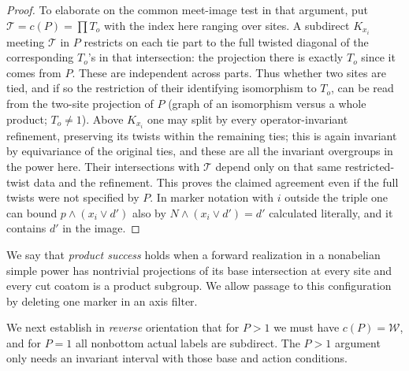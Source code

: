 \begin{proof}
To elaborate on the common meet-image test in that argument, put \(\mathcal T=c(P)=\prod T_o\)
with the index here ranging over sites. A subdirect \(K_{x_i}\) meeting \(\mathcal T\) in \(P\)
restricts on each tie part to the full twisted diagonal of the corresponding \(T_o\)'s in that
intersection: the projection there is exactly \(T_o\) since it comes from \(P\). These are
independent across parts. Thus whether two sites are tied, and if so the restriction of their
identifying isomorphism to \(T_o\), can be read from the two-site projection of \(P\) (graph of an
isomorphism versus a whole product; \(T_o\ne1\)). Above \(K_{x_i}\) one may split by every
operator-invariant refinement, preserving its twists within the remaining ties; this is again
invariant by equivariance of the original ties, and these are all the invariant overgroups in the
power here. Their intersections with \(\mathcal T\) depend only on that same restricted-twist data
and the refinement. This proves the claimed agreement even if the full twists were not specified
by \(P\). In marker notation with \(i\) outside the triple one can bound \(p\wedge(x_i\vee d')\)
also by \(N\wedge(x_i\vee d')=d'\) calculated literally, and it contains \(d'\) in the image.
\end{proof}

\begin{definition}\label{t:weighted-success-definition}
We say that \emph{product success} holds when a forward realization in a
nonabelian simple power has nontrivial projections of its base intersection
at every site and every cut coatom is a product subgroup.  We allow passage
to this configuration by deleting one marker in an axis filter.
\end{definition}

We next establish in \emph{reverse} orientation that for \(P>1\) we must have \(c(P)=\mathcal W\),
and for \(P=1\) all nonbottom actual labels are subdirect. The \(P>1\) argument only needs an
invariant interval with those base and action conditions.

